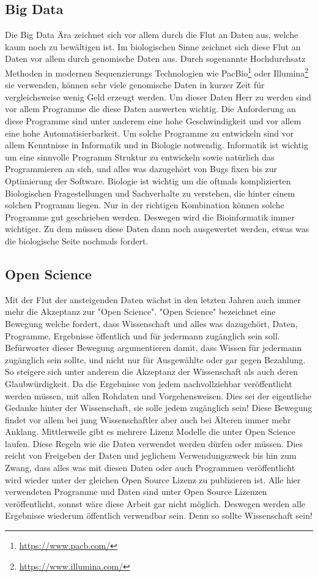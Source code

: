 \documentclass{scrartcl}
\begin{document}
\subsection{Big Data}
\label{sec-2-2}
Die Big Data Ära zeichnet sich vor allem durch die Flut an Daten aus, welche kaum noch zu bewältigen ist. Im biologischen Sinne zeichnet sich diese 
Flut an Daten vor allem durch genomische Daten aus. Durch sogenannte Hochdurchsatz Methoden in modernen Sequenzierungs Technologien wie PacBio\footnote{\url{https://www.pacb.com/}} oder Illumina\footnote{\url{https://www.illumina.com/}}
sie verwenden, können sehr viele genomische Daten in kurzer Zeit für vergleichsweise wenig Geld erzeugt werden. Um dieser Daten Herr zu werden sind vor allem
Programme die diese Daten auswerten wichtig. Die Anforderung an diese Programme sind unter anderem eine hohe Geschwindigkeit und vor allem eine hohe 
Automatisierbarkeit. Um solche Programme zu entwickeln sind vor allem Kenntnisse in Informatik und in Biologie notwendig. Informatik ist wichtig um eine sinnvolle Programm Struktur 
zu entwickeln sowie natürlich das Programmieren an sich, und alles was dazugehört von Bugs fixen bis zur Optimierung der Software. Biologie ist wichtig um die oftmals komplizierten
Biologischen Fragestellungen und Sachverhalte zu verstehen, die hinter einem solchen Programm liegen. Nur in der richtigen Kombination können solche Programme gut geschrieben werden. 
Deswegen wird die Bioinformatik immer wichtiger. Zu dem müssen diese Daten dann noch ausgewertet werden, etwas was die biologische Seite nochmals fordert.  
\subsection{Open Science}
\label{sec-2-3}
Mit der Flut der ansteigenden Daten wächst in den letzten Jahren auch immer mehr die Akzeptanz zur "Open Science".
"Open Science" bezeichnet eine Bewegung welche fordert, dass Wissenschaft und alles was dazugehört, Daten, Programme, Ergebnisse öffentlich und für jedermann 
zugänglich sein soll. Befürworter dieser Bewegung argumentieren damit, dass Wissen für jedermann zugänglich sein sollte, und nicht nur für Ausgewählte oder gar
gegen Bezahlung. So steigere sich unter anderem die Akzeptanz der Wissenschaft als auch deren Glaubwürdigkeit. Da die Ergebnisse von jedem nachvollziehbar 
veröffentlicht werden müssen, mit allen Rohdaten und Vorgehensweisen. Dies sei der eigentliche Gedanke hinter der Wissenschaft, sie solle jedem zugänglich sein!
Diese Bewegung findet vor allem bei jung Wissenschaftler aber auch bei Älteren immer mehr Anklang. Mittlerweile gibt es mehrere Lizenz Modelle die unter
Open Science laufen. Diese Regeln wie die Daten verwendet werden dürfen oder müssen. Dies reicht von Freigeben der Daten und jeglichem Verwendungszweck bis hin
zum Zwang, dass alles was mit diesen Daten oder auch Programmen veröffentlicht wird wieder unter der gleichen Open Source Lizenz zu publizieren ist.
Alle hier verwendeten Programme und Daten sind unter Open Source Lizenzen veröffentlicht, sonnst wäre diese Arbeit gar nicht möglich. 
Deswegen werden alle Ergebnisse wiederum öffentlich verwendbar sein. Denn so sollte Wissenschaft sein!  
\end{document}
